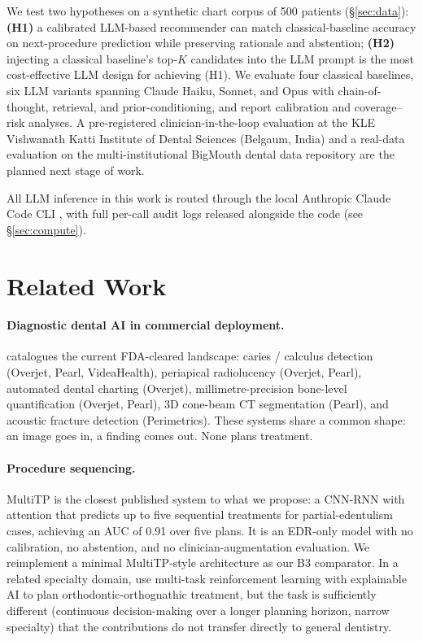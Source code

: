 \documentclass[preprint,authoryear,1p,12pt]{elsarticle}
\begin{document}
We test two hypotheses on a synthetic chart corpus of 500 patients
(\S\ref{sec:data}): \textbf{(H1)} a calibrated LLM-based recommender
can match classical-baseline accuracy on next-procedure prediction
while preserving rationale and abstention; \textbf{(H2)} injecting a
classical baseline's top-$K$ candidates into the LLM prompt is the
most cost-effective LLM design for achieving (H1). We evaluate four
classical baselines, six LLM variants spanning Claude Haiku, Sonnet,
and Opus with chain-of-thought, retrieval, and prior-conditioning, and
report calibration and coverage--risk analyses. A pre-registered
clinician-in-the-loop evaluation at the KLE Vishwanath Katti Institute
of Dental Sciences (Belgaum, India) and a real-data evaluation on the
multi-institutional BigMouth dental data repository
\citep{walji2014bigmouth, walji2022bigmouth} are the planned next stage
of work.

All LLM inference in this work is routed through the local Anthropic
Claude Code CLI \citep{anthropic2026claudecode}, with full per-call
audit logs released alongside the code (see \S\ref{sec:compute}).

\section{Related Work}
\label{sec:related}

\paragraph{Diagnostic dental AI in commercial deployment.}
\cite{shujaat2026fdaai} catalogues the current FDA-cleared landscape:
caries / calculus detection (Overjet, Pearl, VideaHealth), periapical
radiolucency (Overjet, Pearl), automated dental charting (Overjet),
millimetre-precision bone-level quantification (Overjet, Pearl), 3D
cone-beam CT segmentation (Pearl), and acoustic fracture detection
(Perimetrics). These systems share a common shape: an image goes in, a
finding comes out. None plans treatment.

\paragraph{Procedure sequencing.} MultiTP
\citep{chen2024multitp} is the closest published system to what we
propose: a CNN-RNN with attention that predicts up to five sequential
treatments for partial-edentulism cases, achieving an AUC of 0.91 over
five plans. It is an EDR-only model with no calibration, no
abstention, and no clinician-augmentation evaluation. We reimplement a
minimal MultiTP-style architecture as our B3 comparator. In a related
specialty domain, \cite{li2025orthognathic} use multi-task
reinforcement learning with explainable AI to plan
orthodontic-orthognathic treatment, but the task is sufficiently different
(continuous decision-making over a longer planning horizon, narrow
specialty) that the contributions do not transfer directly to general
dentistry.
\end{document}
